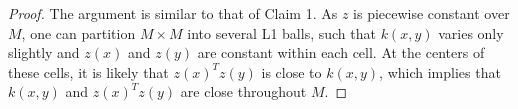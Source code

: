  \begin{proof}
    The argument is similar to that of Claim 1. As $z$ is piecewise constant over $M$, one can partition $M \times M$ into several L1 balls, such that $k(x,y)$ varies only slightly and $z(x)$ and $z(y)$ are constant within each cell. At the centers of these cells, it is likely that $z(x)^T z(y)$ is close to $k(x, y)$, which implies that $k(x, y)$ and $z(x)^T z(y)$ are close throughout $M$.
 \end{proof}






